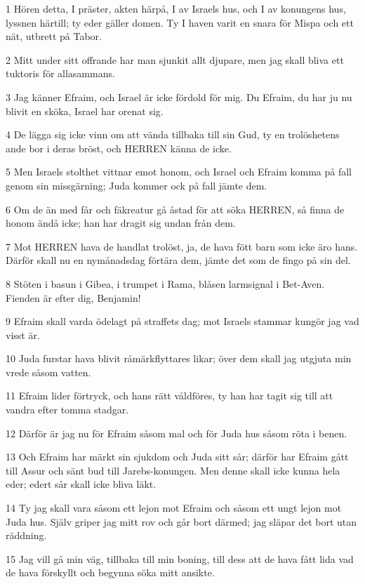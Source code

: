 \par 1 Hören detta, I präster, akten härpå, I av Israels hus, och I av konungens hus, lyssnen härtill; ty eder gäller domen. Ty I haven varit en snara för Mispa och ett nät, utbrett på Tabor.
\par 2 Mitt under sitt offrande har man sjunkit allt djupare, men jag skall bliva ett tuktoris för allasammans.
\par 3 Jag känner Efraim, och Israel är icke fördold för mig. Du Efraim, du har ju nu blivit en sköka, Israel har orenat sig.
\par 4 De lägga sig icke vinn om att vända tillbaka till sin Gud, ty en trolöshetens ande bor i deras bröst, och HERREN känna de icke.
\par 5 Men Israels stolthet vittnar emot honom, och Israel och Efraim komma på fall genom sin missgärning; Juda kommer ock på fall jämte dem.
\par 6 Om de än med får och fäkreatur gå åstad för att söka HERREN, så finna de honom ändå icke; han har dragit sig undan från dem.
\par 7 Mot HERREN hava de handlat trolöst, ja, de hava fött barn som icke äro hans. Därför skall nu en nymånadsdag förtära dem, jämte det som de fingo på sin del.
\par 8 Stöten i basun i Gibea, i trumpet i Rama, blåsen larmsignal i Bet-Aven. Fienden är efter dig, Benjamin!
\par 9 Efraim skall varda ödelagt på straffets dag; mot Israels stammar kungör jag vad visst är.
\par 10 Juda furstar hava blivit råmärkflyttares likar; över dem skall jag utgjuta min vrede såsom vatten.
\par 11 Efraim lider förtryck, och hans rätt våldföres, ty han har tagit sig till att vandra efter tomma stadgar.
\par 12 Därför är jag nu för Efraim såsom mal och för Juda hus såsom röta i benen.
\par 13 Och Efraim har märkt sin sjukdom och Juda sitt sår; därför har Efraim gått till Assur och sänt bud till Jarebs-konungen. Men denne skall icke kunna hela eder; edert sår skall icke bliva läkt.
\par 14 Ty jag skall vara såsom ett lejon mot Efraim och såsom ett ungt lejon mot Juda hus. Själv griper jag mitt rov och går bort därmed; jag släpar det bort utan räddning.
\par 15 Jag vill gå min väg, tillbaka till min boning, till dess att de hava fått lida vad de hava förskyllt och begynna söka mitt ansikte.

